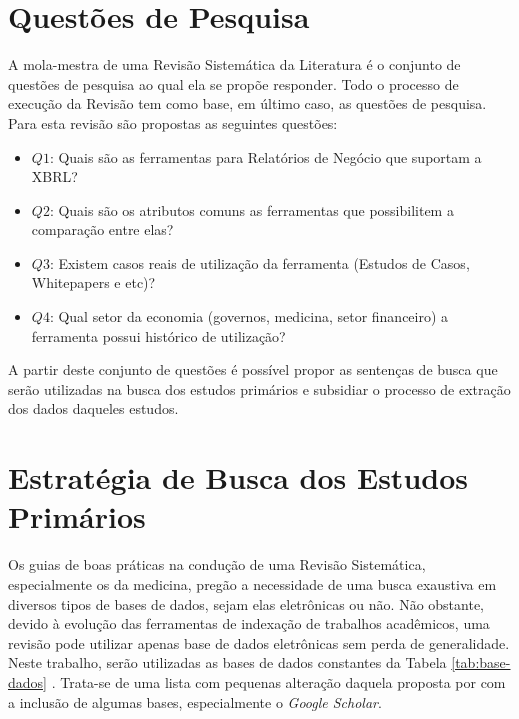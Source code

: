 \documentclass{article}
\begin{document}
\section{Questões de Pesquisa}
\label{sec:questoes_pesquisa}

A mola-mestra de uma Revisão Sistemática da Literatura é o conjunto de questões de pesquisa ao qual ela se propõe responder. Todo o processo de execução da Revisão tem como base, em último caso, as questões de pesquisa. Para esta revisão são propostas as seguintes questões:

\begin{itemize}
  \item \textbf{$Q1$}: Quais são as ferramentas para Relatórios de Negócio que
    suportam a XBRL?
  \item \textbf{$Q2$}: Quais são os atributos comuns as ferramentas
    que possibilitem a comparação entre elas?
  \item \textbf{$Q3$}: Existem casos reais de utilização da ferramenta
    (Estudos de Casos, Whitepapers e etc)?
  \item \textbf{$Q4$}: Qual setor da economia (governos, medicina, setor financeiro) a ferramenta possui histórico de utilização?
\end{itemize}
A partir deste conjunto de questões é possível propor as sentenças de busca que serão utilizadas na busca dos estudos primários e subsidiar o processo de extração dos dados daqueles estudos.

\section{Estratégia de Busca dos Estudos Primários}
\label{sec:busca_estudos}

Os guias de boas práticas na condução de uma Revisão Sistemática, especialmente os da medicina, pregão a necessidade de uma busca exaustiva em diversos tipos de bases de dados, sejam elas eletrônicas ou não. Não obstante, devido à evolução das ferramentas de indexação de trabalhos acadêmicos, uma revisão pode utilizar apenas base de dados eletrônicas sem perda de generalidade. Neste trabalho, serão utilizadas as bases de dados constantes da Tabela \ref{tab:base-dados} . Trata-se de uma lista com pequenas alteração daquela proposta por \cite{Brereton2007571} com a inclusão de algumas bases, especialmente o \textit{Google Scholar}.
\end{document}

